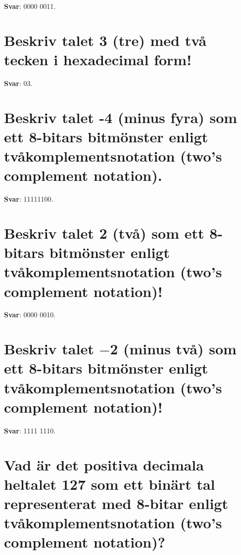 \documentclass[a4paper,11pt,oneside]{book}
\begin{document}
\begin{sloppypar}
\label{q:366:sa:sv:True}

\textbf{Svar}: 0000 0011.



\section{Beskriv talet 3 (tre) med tv\r{a} tecken i hexadecimal form!}

\label{q:367:sa:sv:True}

\textbf{Svar}: 03.



\section{Beskriv talet -4 (minus fyra) som ett 8-bitars bitm\"onster enligt tv\r{a}komplementsnotation (two{\textquoteright}s complement notation).}

\label{q:368:sa:sv:True}

\textbf{Svar}: 11111100.



\section{Beskriv talet 2 (tv\r{a}) som ett 8-bitars bitm\"onster enligt tv\r{a}komplementsnotation (two{\textquoteright}s complement notation)!}

\label{q:369:sa:sv:True}

\textbf{Svar}: 0000 0010.



\section{Beskriv talet \ensuremath{-}2 (minus tv\r{a}) som ett 8-bitars bitm\"onster enligt tv\r{a}komplementsnotation (two{\textquoteright}s complement notation)!}

\label{q:370:sa:sv:True}

\textbf{Svar}: 1111 1110.



\section{Vad \"ar det positiva decimala heltalet 127 som ett bin\"art tal representerat med 8-bitar enligt tv\r{a}komplementsnotation (two{\textquoteright}s complement notation)?}

\label{q:371:sa:sv:True}


\end{sloppypar}
\end{document}
